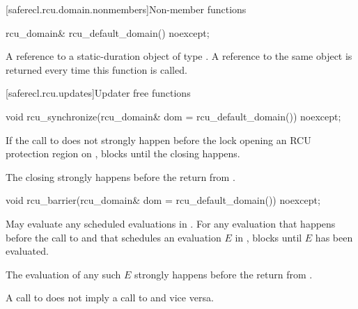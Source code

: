 [saferecl.rcu.domain.nonmembers]{Non-member functions}

\begin{itemdecl}
rcu_domain& rcu_default_domain() noexcept;
\end{itemdecl}

\begin{itemdescr}

\pnum
\returns
A reference to a static-duration object of type .
A reference to the same object is returned every time this
function is called.

\end{itemdescr}

[saferecl.rcu.updates]{Updater free functions}

\begin{itemdecl}
void rcu_synchronize(rcu_domain& dom = rcu_default_domain()) noexcept;
\end{itemdecl}

\begin{itemdescr}

\pnum
\effects
If the call to  does not strongly
happen before the lock opening an RCU protection region 
on , blocks until the  closing 
happens.

\pnum
\sync
The  closing  strongly
happens before the return from .

\end{itemdescr}

\begin{itemdecl}
void rcu_barrier(rcu_domain& dom = rcu_default_domain()) noexcept;
\end{itemdecl}

\begin{itemdescr}

\pnum
\effects
May evaluate any scheduled evaluations in
. For any evaluation that happens before the call
to  and that schedules an evaluation $E$
in , blocks until $E$ has been evaluated.

\pnum
\sync
The evaluation of any such $E$ strongly
happens before the return from .

\begin{note}
A call to  does not imply a call to 
and vice versa.
\end{note}

\end{itemdescr}

